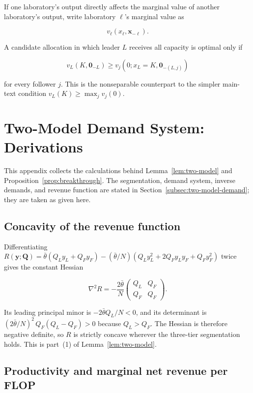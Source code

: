 \documentclass[11pt]{article}
\begin{document}
If one laboratory's output directly affects the marginal value of another laboratory's output, write laboratory $\ell$'s marginal value as

\begin{equation}v_\ell(x_\ell,\mathbf x_{-\ell}).\end{equation}

A candidate allocation in which leader $L$ receives all capacity is optimal only if

\begin{equation}v_L(K,\mathbf 0_{-L})\geq v_j\left(0;x_L=K,\mathbf 0_{-(L,j)}\right)\end{equation}

for every follower $j$. This is the nonseparable counterpart to the simpler main-text condition $v_L(K)\geq\max_j v_j(0)$.

\section{Two-Model Demand System: Derivations}
\label{app:two-model}

This appendix collects the calculations behind Lemma~\ref{lem:two-model} and Proposition~\ref{prop:breakthrough}. The segmentation, demand system, inverse demands, and revenue function are stated in Section~\ref{subsec:two-model-demand}; they are taken as given here.

\subsection{Concavity of the revenue function}

Differentiating $R(\mathbf y;\mathbf Q)=\bar\theta(Q_L y_L+Q_F y_F)-(\bar\theta/N)(Q_L y_L^{2}+2Q_F y_L y_F+Q_F y_F^{2})$ twice gives the constant Hessian

\begin{equation}\nabla^{2}R=-\frac{2\bar\theta}{N}\begin{pmatrix}Q_L & Q_F\\ Q_F & Q_F\end{pmatrix}.\end{equation}

Its leading principal minor is $-2\bar\theta Q_L/N<0$, and its determinant is $(2\bar\theta/N)^{2}\,Q_F(Q_L-Q_F)>0$ because $Q_L>Q_F$. The Hessian is therefore negative definite, so $R$ is strictly concave wherever the three-tier segmentation holds. This is part~(1) of Lemma~\ref{lem:two-model}.

\subsection{Productivity and marginal net revenue per FLOP}
\end{document}
